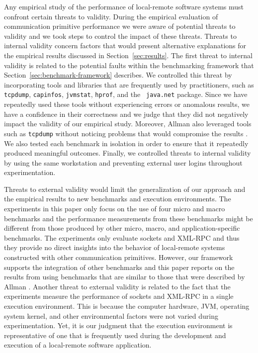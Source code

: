\documentclass{sig-alternate}
\begin{document}
Any empirical study of the performance of local-remote software
systems must confront certain threats to validity.  During the
empirical evaluation of communication primitive performance we were
aware of potential threats to validity and we took steps to control
the impact of these threats.  Threats to internal validity concern
factors that would present alternative explanations for the empirical
results discussed in Section~\ref{sec:results}.  The first threat to
internal validity is related to the potential faults within the
benchmarking framework that Section~\ref{sec:benchmark-framework}
describes.  We controlled this threat by incorporating tools and
libraries that are frequently used by practitioners, such as {\tt
  tcpdump}, {\tt capinfos}, {\tt jvmstat}, {\tt hprof}, and the {\tt
  java.net} package.  Since we have repeatedly used these tools
without experiencing errors or anomalous results, we have a confidence
in their correctness and we judge that they did not negatively impact
the validity of our empirical study.  Moreover, Allman also leveraged
tools such as {\tt tcpdump} without noticing problems that would
compromise the results \cite{allman-per}.  We also tested each
benchmark in isolation in order to ensure that it repeatedly produced
meaningful outcomes.  Finally, we controlled threats to internal
validity by using the same workstation and preventing external user
logins throughout experimentation.

Threats to external validity would limit the generalization of our
approach and the empirical results to new benchmarks and execution
environments.  The experiments in this paper only focus on the use of
four micro and macro benchmarks and the performance measurements from
these benchmarks might be different from those produced by other
micro, macro, and application-specific benchmarks.  The experiments
only evaluate sockets and XML-RPC and thus they provide no direct
insights into the behavior of local-remote systems constructed with
other communication primitives.  However, our framework supports the
integration of other benchmarks and this paper reports on the results
from using benchmarks that are similar to those that were described by
Allman \cite{allman-per}.  Another threat to external validity is
related to the fact that the experiments measure the performance of
sockets and XML-RPC in a single execution environment. This is because
the computer hardware, JVM, operating system kernel, and other
environmental factors were not varied during experimentation.  Yet, it
is our judgment that the execution environment is representative of
one that is frequently used during the development and execution of a
local-remote software application.
\end{document}
